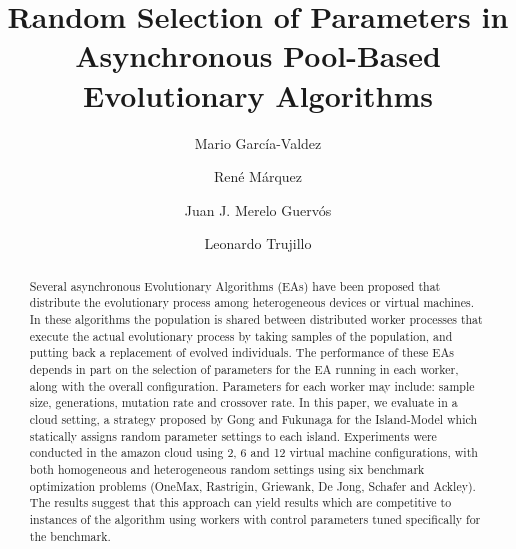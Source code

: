 \documentclass{llncs}
\begin{document}
\sloppy

\title{Random Selection of Parameters in Asynchronous Pool-Based Evolutionary Algorithms}

\author{Mario Garc\'ia-Valdez \and Ren\'e M\'arquez \and Juan J. Merelo Guerv\'os \and  Leonardo Trujillo }


\maketitle

\begin{abstract}
Several asynchronous Evolutionary Algorithms (EAs) have been proposed that distribute the
evolutionary process among heterogeneous devices or virtual machines.
In these algorithms the population is shared between distributed worker processes that 
execute the actual evolutionary process by taking samples of the population, and putting back
a replacement of evolved individuals. The performance of these EAs depends in part 
on the selection of parameters for the EA running in each worker, 
along with the overall configuration. Parameters for each worker may include: 
sample size, generations, mutation rate and crossover rate. In this paper, we evaluate in a cloud 
setting, a strategy proposed by Gong and Fukunaga for the Island-Model which statically 
assigns random parameter settings to each island. Experiments were conducted in the amazon
cloud using 2, 6 and 12 virtual machine configurations, with both homogeneous and heterogeneous
random settings using six benchmark optimization problems (OneMax, Rastrigin, Griewank, De Jong,
Schafer and Ackley). The results suggest that this approach can yield results which are competitive to
instances of the algorithm using workers with control parameters tuned specifically for the 
benchmark. 

\end{abstract}
\end{document}
